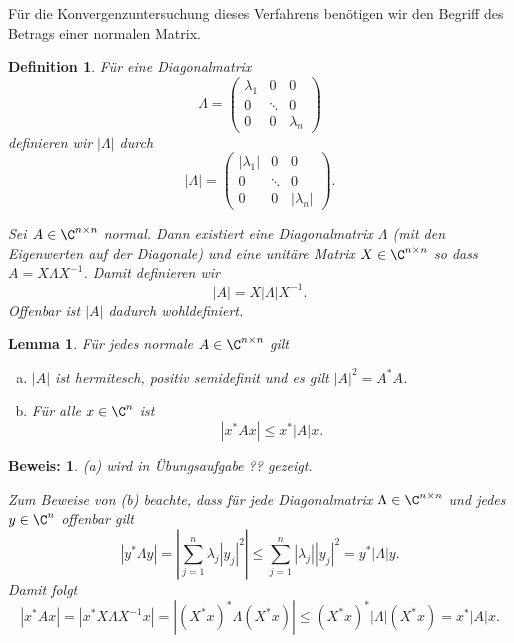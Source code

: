 \documentclass[
]{mycourse}
\theoremstyle{mythm}
\newtheorem{lemma}[theorem]{Lemma}
\newtheorem{definition}[theorem]{Definition}
\theoremstyle{break}
\newtheorem*{beweis}{Beweis:}
\begin{document}
Für die Konvergenzuntersuchung dieses Verfahrens benötigen wir den Begriff des Betrags einer normalen Matrix.
\begin{definition}
Für eine Diagonalmatrix 
\[
\Lambda=\begin{pmatrix} \lambda_1 & 0 & 0\\ 0 & \ddots & 0\\ 0 & 0 & \lambda_n\end{pmatrix}
\]
definieren wir $|\Lambda|$ durch
\[
|\Lambda|=\begin{pmatrix} |\lambda_1| & 0 & 0\\ 0 & \ddots & 0\\ 0 & 0 & |\lambda_n| \end{pmatrix}.
\]

Sei $A \in \C^{n\times n}$ normal. Dann existiert eine Diagonalmatrix $\Lambda$ (mit den Eigenwerten auf der Diagonale)
und eine unitäre Matrix $X\in \C^{n\times n}$ so dass $A=X \Lambda X^{-1}$.
Damit definieren wir
\[
|A|=X |\Lambda| X^{-1}.
\]
Offenbar ist $|A|$ dadurch wohldefiniert.
\end{definition}

\begin{lemma}\label{lemma:betrag}
Für jedes normale $A\in \C^{n\times n}$ gilt
\begin{enumerate}[(a)]
\item $|A|$ ist hermitesch, positiv semidefinit und es gilt $|A|^2=A^* A$.
\item Für alle $x\in \C^n$ ist
\[
|x^* A x | \leq x^* |A| x.
\]
\end{enumerate}
\end{lemma}
\begin{beweis}
(a) wird in Übungsaufgabe ?? gezeigt.

Zum Beweise von (b) beachte, dass für jede Diagonalmatrix $\Lambda\in \C^{n\times n}$ und jedes
$y\in \C^n$ offenbar gilt
\[
|y^* \Lambda y|=\left| \sum_{j=1}^n \lambda_j |y_j|^2\right| \leq \sum_{j=1}^n |\lambda_j| |y_j|^2 = y^* |\Lambda| y.
\]
Damit folgt 
\[
|x^* A x | = | x^* X \Lambda X^{-1} x | = | (X^*x)^* \Lambda (X^* x)| \leq (X^* x)^* |\Lambda| (X^* x) =  x^* |A| x.
\]
\end{beweis}
\end{document}
